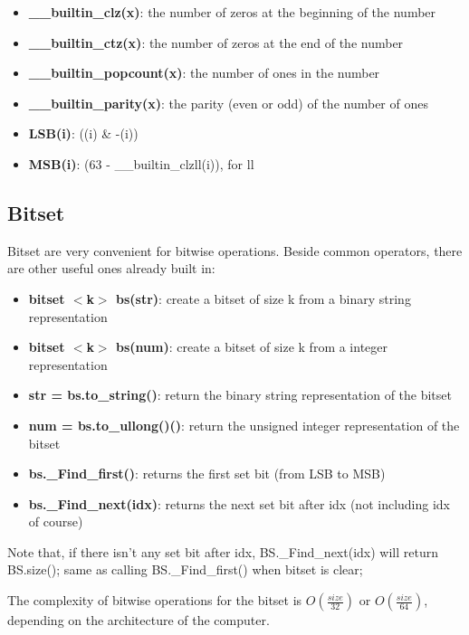    \begin{itemize} 
        \item \textbf{\_\_builtin\_clz(x)}: the number of zeros at the beginning of the number
        \item \textbf{\_\_builtin\_ctz(x)}: the number of zeros at the end of the number
        \item \textbf{\_\_builtin\_popcount(x)}: the number of ones in the number
        \item \textbf{\_\_builtin\_parity(x)}: the parity (even or odd) of the number of ones

        \item \textbf{LSB(i)}: ((i) \& -(i))
        \item \textbf{MSB(i)}: (63 - \_\_builtin\_clzll(i)), for ll
    \end{itemize}
    
    \subsection{Bitset}

    Bitset are very convenient for bitwise operations. Beside common operators, there are other useful ones already built in:
    
    \begin{itemize} 
        \item \textbf{bitset $<$k$>$ bs(str)}: create a bitset of size k from a binary string representation
        \item \textbf{bitset $<$k$>$ bs(num)}: create a bitset of size k from a integer representation
        \item \textbf{str = bs.to\_string()}: return the binary string representation of the bitset
        \item \textbf{num = bs.to\_ullong()()}: return the unsigned integer representation of the bitset
        \item \textbf{bs.\_Find\_first()}: returns the first set bit (from LSB to MSB)
        \item \textbf{bs.\_Find\_next(idx)}: returns the next set bit after idx (not including idx of course)
    \end{itemize}

    Note that, if there isn't any set bit after idx, BS.\_Find\_next(idx) will return BS.size(); 
    same as calling BS.\_Find\_first() when bitset is clear;

    The complexity of bitwise operations for the bitset is $O(\frac{size}{32})$ or $O(\frac{size}{64})$, 
    depending on the architecture of the computer.
    
